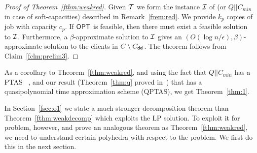 \begin{proof}[Proof of Theorem~\ref{fthm:weakred}]
	Given ${\cal T}$ we form the instance ${\cal I}$  of \cckp (or $Q||C_{min}$ in case of soft-capacities) described in Remark~\ref{frem:red}. We provide $k_p$ copies of job with capacity $c_p$. If $\mathsf{OPT}$ is feasible, then there must exist a feasible solution to ${\cal I}$. Furthermore, a $\beta$-approximate solution to ${\cal I}$ gives an $\left(O(\log n/\epsilon),\beta\right)$-approximate solution to the clients in $C\setminus C_{\mathsf{del}}$. The theorem follows from Claim~\ref{fclm:prelim3}.
%	
\end{proof}

As a corollary to Theorem~\ref{fthm:weakred}, and using the fact that $Q||C_{min}$ has a PTAS ~\cite{AzarE98},  and our result (Theorem~\ref{thm:q} proved in~) that \cckp has a quasipolynomial time approximation scheme (QPTAS), we get Theorem~\ref{thm:1}.\medskip


In Section~\ref{fsec:o1} we state a much stronger decomposition theorem than Theorem~\ref{fthm:weakdecomp} which exploits the LP solution.
To exploit it for \mckc problem, however, and prove an analogous theorem as Theorem~\ref{fthm:weakred}, we need to understand certain polyhedra with respect to the \cckp problem.
We first do this in the next section.
